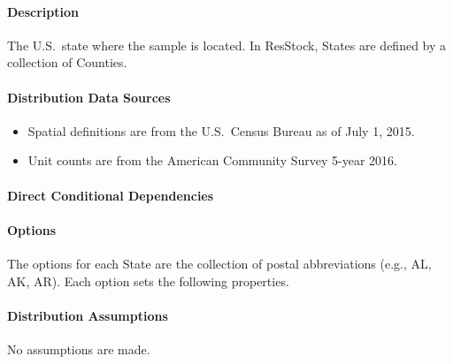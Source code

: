 \paragraph{Description}
% 
The U.S.~state where the sample is located. In ResStock, States are defined by a collection of Counties.

\paragraph{Distribution Data Sources}
% 
\begin{itemize}
\item
  Spatial definitions are from the U.S.~Census Bureau as of July 1,
  2015.
\item
  Unit counts are from the American Community Survey 5-year 2016.
\end{itemize}

\paragraph{Direct Conditional Dependencies}


\paragraph{Options}
The options for each State are the collection of postal abbreviations (e.g., AL, AK, AR). Each option sets the following properties.



\paragraph{Distribution Assumptions}
% 
No assumptions are made.
